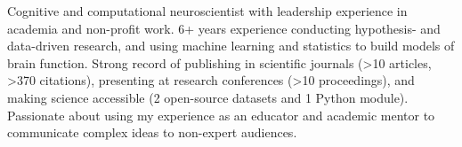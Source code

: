 

\begin{cvparagraph}

Cognitive and computational neuroscientist with leadership experience in academia and non-profit work. 6+ years experience conducting hypothesis- and data-driven research, and using machine learning and statistics to build models of brain function. Strong record of publishing in scientific journals (>10 articles, >370 citations), presenting at research conferences (>10 proceedings), and making science accessible (2 open-source datasets and 1 Python module). Passionate about using my experience as an educator and academic mentor to communicate complex ideas to non-expert audiences. 

\end{cvparagraph}
